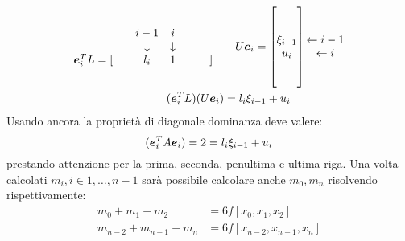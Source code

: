 \begin{displaymath}
\begin{split}
	\begin{matrix}
		& & i-1 & i  \\
		& & \downarrow & \downarrow \\
		\boldsymbol{e}_{i}^{T}L = [& & l_{i} & 1 & & &]
	\end{matrix}
	\quad & \quad
	U \boldsymbol{e}_{i} = \begin{bmatrix}
		\\ 
		\\ 
		\xi_{i-1} \\ 
		u_{i} \\
	 	\\
	 	\\
	\end{bmatrix} 
	\begin{matrix}
		\\ 
		\\  
		\leftarrow i-1 \\
		\leftarrow i \\
	 	\\
	 	\\
	\end{matrix} \\
	(\boldsymbol{e}_{i}^{T}L )(U \boldsymbol{e}_{i}) &= l_{i} \xi_{i-1} + u_{i} 
\end{split}
\end{displaymath}
Usando ancora la propriet\`a di diagonale dominanza deve valere:
\begin{displaymath}
	(\boldsymbol{e}_{i}^{T} A \boldsymbol{e}_{i}) = 2 = l_{i} \xi_{i-1} + u_{i}
\end{displaymath}
prestando attenzione per la prima, seconda, penultima e ultima riga.
Una volta calcolati $m_{i}, i \in {1, \ldots, n-1}$ sar\`a possibile calcolare
anche $m_{0}, m_{n}$ risolvendo rispettivamente:
\begin{displaymath}
\begin{split}
m_{0} + m_{1} + m_{2} &= 6f[x_{0}, x_{1}, x_{2}]\\
m_{n-2} + m_{n-1} + m_{n} &= 6f[x_{n-2}, x_{n-1}, x_{n}]
\end{split}
\end{displaymath}

